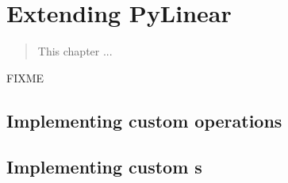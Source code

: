 \chapter{Extending PyLinear}
\label{cha:extending}

\begin{quote}
   This chapter ...
\end{quote}

FIXME
 

\section{Implementing custom operations}

\section{Implementing custom s}
